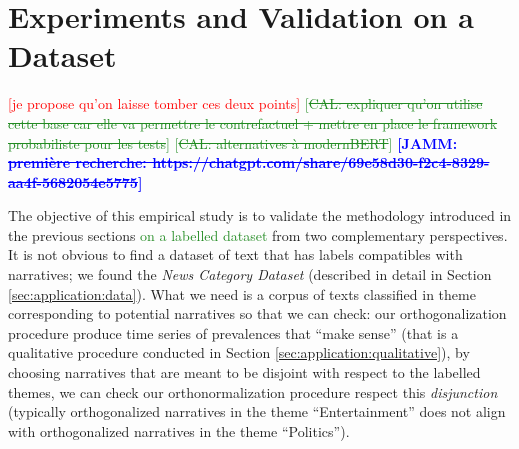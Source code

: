 \documentclass[
  journal=medium,
  manuscript=article-type,
  year=2025,
  volume=1,
]{cup-journal}
\def\Esp{\mathbb{E}}
\newcommand{\JAMM}[1]{\textcolor{blue}{\textbf{[JAMM: #1]}}}
\begin{document}
\bigskip 


\section{Experiments and Validation on a Dataset}
\label{sec:application}

\textcolor{red}{[je propose qu'on laisse tomber ces deux points]}
\textcolor{ForestGreen}{[\st{CAL: expliquer qu'on utilise cette base car elle va permettre le contrefactuel + mettre en place le framework probabiliste pour les tests}]}
\textcolor{ForestGreen}{[\st{CAL: alternatives à modernBERT}]}
\JAMM{\st{première recherche: https://chatgpt.com/share/69e58d30-f2c4-8329-aa4f-5682054e5775}}


The objective of this empirical study is to validate the methodology introduced in the previous sections \textcolor{ForestGreen}{on a labelled dataset} from two complementary perspectives. 
{\color{ForestGreen}
It is not obvious to find a dataset of text that has labels compatibles with narratives; we found the \emph{News Category Dataset} (described in detail in Section \ref{sec:application:data}).
What we need is a corpus of texts classified in theme corresponding to potential narratives so that we can check:
our orthogonalization procedure produce time series of prevalences that ``make sense'' (that is a qualitative procedure conducted in Section \ref{sec:application:qualitative}), 
by choosing narratives that are meant to be disjoint with respect to the labelled themes, we can check our orthonormalization procedure respect this \emph{disjunction} (typically orthogonalized narratives in the theme ``Entertainment'' does not align with orthogonalized narratives in the theme ``Politics'').
}
\end{document}
